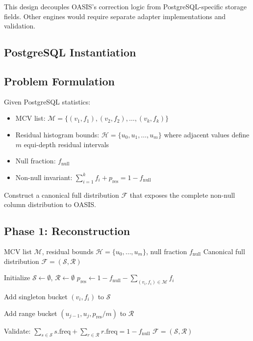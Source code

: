 This design decouples OASIS's correction logic from PostgreSQL-specific storage
fields. Other engines would require separate adapter implementations and
validation.

\subsection{PostgreSQL Instantiation}

\subsection{Problem Formulation}

Given PostgreSQL statistics:
\begin{itemize}
    \item MCV list: $\mathcal{M} = \{(v_1, f_1), (v_2, f_2), \ldots, (v_k, f_k)\}$
    \item Residual histogram bounds: $\mathcal{H} = \{u_0, u_1, \ldots, u_m\}$ where adjacent values define $m$ equi-depth residual intervals
    \item Null fraction: $f_{\mathrm{null}}$
    \item Non-null invariant: $\sum_{i=1}^{k} f_i + p_{\mathrm{res}} = 1 - f_{\mathrm{null}}$
\end{itemize}

Construct a canonical full distribution $\mathcal{F}$ that exposes the complete
non-null column distribution to OASIS.

\subsection{Phase 1: Reconstruction}

\begin{algorithm}[H]
\caption{Reconstruct Canonical Full Distribution from PostgreSQL Statistics}
\label{alg:reconstruct}
\begin{algorithmic}[1]
\REQUIRE MCV list $\mathcal{M}$, residual bounds $\mathcal{H} = \{u_0, \ldots, u_m\}$, null fraction $f_{\mathrm{null}}$
\ENSURE Canonical full distribution $\mathcal{F} = (\mathcal{S}, \mathcal{R})$

\STATE Initialize $\mathcal{S} \leftarrow \emptyset$, $\mathcal{R} \leftarrow \emptyset$
\STATE $p_{\mathrm{res}} \leftarrow 1 - f_{\mathrm{null}} - \sum_{(v_i,f_i) \in \mathcal{M}} f_i$

    \STATE Add singleton bucket $(v_i, f_i)$ to $\mathcal{S}$
\ENDFOR

    \STATE Add range bucket $(u_{j-1}, u_j, p_{\mathrm{res}} / m)$ to $\mathcal{R}$
\ENDFOR

\STATE Validate: $\sum_{s \in \mathcal{S}} s.\mathrm{freq} + \sum_{r \in \mathcal{R}} r.\mathrm{freq} = 1 - f_{\mathrm{null}}$
\RETURN $\mathcal{F} = (\mathcal{S}, \mathcal{R})$
\end{algorithmic}
\end{algorithm}

